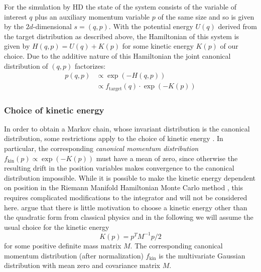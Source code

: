 For the simulation by HD the state of the system consists of the variable of interest $q$ plus an auxiliary momentum variable $p$ of the same size and so is given by the $2d$-dimensional $s = (q, p)$. With the potential energy $U(q)$ derived from the target distribution as described above, the Hamiltonian of this system is given by $H(q, p) = U(q) + K(p)$ for some kinetic energy $K(p)$ of our choice. Due to the additive nature of this Hamiltonian the joint canonical distribution of $(q, p)$ factorizes:
\begin{equation} \label{eq:JointDensity}
\begin{split}
p(q, p) &\propto \exp \left( -H(q, p) \right) \\
			&\propto f_\textrm{target}(q) \cdot \exp{(-K(p))}
\end{split}
\end{equation}

\subsubsection{Choice of kinetic energy}
In order to obtain a Markov chain, whose invariant distribution is the canonical distribution, some restrictions apply to the choice of kinetic energy \parencite{Betancourt2014}. In particular, the corresponding \textit{canonical momentum distribution} $f_\textrm{kin}(p) \propto \exp{(-K(p))}$ must have a mean of zero, since otherwise the resulting drift in the position variables makes convergence to the canonical distribution impossible. While it is possible to make the kinetic energy dependent on position in the Riemann Manifold Hamiltonian Monte Carlo method \parencite{Girolami2011}, this requires complicated modifications to the integrator and will not be considered here. \textcite{Betancourt2014} argue that there is little motivation to choose a kinetic energy other than the quadratic form from classical physics and in the following we will assume the usual choice for the kinetic energy
\begin{equation} \label{eq:KineticEnergy}
K(p) = p^T M^{-1} p/2
\end{equation}
for some positive definite mass matrix $M$. The corresponding canonical momentum distribution (after normalization) $f_\textrm{kin}$ is the multivariate Gaussian distribution with mean zero and covariance matrix $M$.

